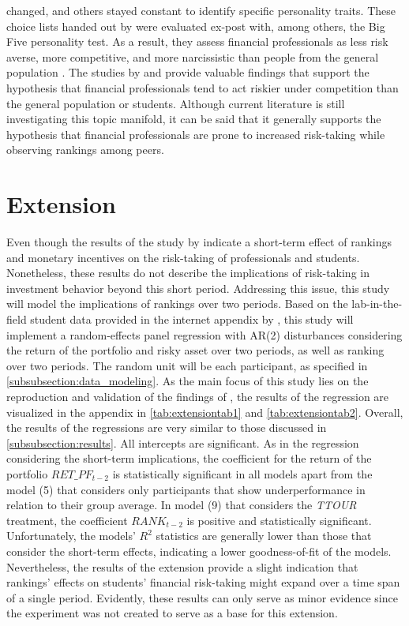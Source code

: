 \documentclass[12pt]{article}
\begin{document}
changed, and others stayed constant to identify specific personality traits. These choice lists handed out by \textcite[p.~2954]{Holmen2023} were evaluated ex-post with, among others, the Big Five personality test. As a result, they assess financial professionals as less risk averse, more competitive, and more narcissistic than people from the general population \parencite[p.~2972]{Holmen2023}. The studies by \textcite{Holmen2023} and \textcite{Gillenkirch2018} provide valuable findings that support the hypothesis that financial professionals tend to act riskier under competition than the general population or students. Although current literature is still investigating this topic manifold, it can be said that it generally supports the hypothesis that financial professionals are prone to increased risk-taking while observing rankings among peers.

\section{Extension} \label{section:extension}
Even though the results of the study by \textcite{Kirchler2018} indicate a short-term effect of rankings and monetary incentives on the risk-taking of professionals and students. Nonetheless, these results do not describe the implications of risk-taking in investment behavior beyond this short period. Addressing this issue, this study will model the implications of rankings over two periods. Based on the lab-in-the-field student data provided in the internet appendix by \textcite{Kirchler2018}, this study will implement a random-effects panel regression with AR(2) disturbances considering the return of the portfolio and risky asset over two periods, as well as ranking over two periods. The random unit will be each participant, as specified in \autoref{subsubsection:data_modeling}. As the main focus of this study lies on the reproduction and validation of the findings of \textcite{Kirchler2018}, the results of the regression are visualized in the appendix in \autoref{tab:extensiontab1} and \autoref{tab:extensiontab2}. Overall, the results of the regressions are very similar to those discussed in \autoref{subsubsection:results}. All intercepts are significant. As in the regression considering the short-term implications, the coefficient for the return of the portfolio \textit{$RET\_PF_{t-2}$} is statistically significant in all models apart from the model (5) that considers only participants that show underperformance in relation to their group average. In model (9) that considers the \textit{TTOUR} treatment, the coefficient \textit{$RANK_{t-2}$} is positive and statistically significant. Unfortunately, the models' $R^{2}$ statistics are generally lower than those that consider the short-term effects, indicating a lower goodness-of-fit of the models. Nevertheless, the results of the extension provide a slight indication that rankings' effects on students' financial risk-taking might expand over a time span of a single period. Evidently, these results can only serve as minor evidence since the experiment was not created to serve as a base for this extension.
\end{document}

